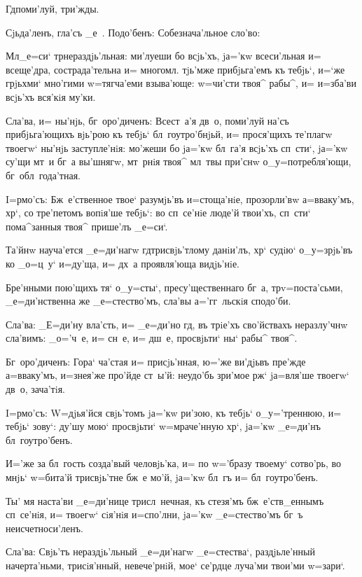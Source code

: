  Гд поми'луй, три'жды.

Сjьда'ленъ, гла'съ _е~. Подо'бенъ: Собезнача'льное 
сло'во:

Мл _е=си` тр нераздjь'льная: ми'луеши бо 
всjь'хъ, jа='кw всеси'льная и= всеще'дра, сострада'тельна 
и= многомл. тjь'мже прибjьга'емъ къ тебjь`, и=`же 
грjьхми` мно'гими w=тягча'еми взыва'юще: w=чи'сти твоя^ 
рабы^, и= и=зба'ви всjь'хъ вся'кiя му'ки.

Сла'ва, и= ны'нjь, бг~оро'диченъ: Всест~а'я дв~о, 
поми'луй на'съ прибjьга'ющихъ вjь'рою къ тебjь` 
бл~гоутро'бнjьй, и= прося'щихъ те'плагw твоегw` ны'нjь 
заступле'нiя: мо'жеши бо jа='кw бл~га'я всjь'хъ сп~сти`, 
jа='кw су'щи мт~и бг~а вы'шнягw, мт~рнiя твоя^ мл~твы 
при'снw о_у=потребля'ющи, бг~обл~года'тная.


I=рмо'съ: Бж~е'ственное твое` разумjь'въ и=стоща'нiе, 
прозорли'вw а=вваку'мъ, хр`, со тре'петомъ вопiя'ше 
тебjь`: во сп~се'нiе люде'й твои'хъ, сп~сти` пома^занныя 
твоя^ прише'лъ _е=си`.

Та'йнw науча'ется _е=ди'нагw гд трисвjь'тлому 
данiи'лъ, хр` судiю` о_у=зрjь'въ ко _о=ц~у` и=ду'ща, 
и= дх~а проявля'юща видjь'нiе. 

Бре'нными пою'щихъ тя` о_у=сты`, пресу'щественнаго 
бг~а, тр v=поста'сьми, _е=ди'нственна же 
_е=стество'мъ, сла'вы а='гг~льскiя сподо'би.

Сла'ва: _Е=ди'ну вла'сть, и= _е=ди'но гд, въ 
трiе'хъ сво'йствахъ неразлу'чнw сла'вимъ: _о='ч~е, и= 
сн~е, и= дш~е, просвjьти` ны` рабы^ твоя^.

Бг~оро'диченъ: Гора` ча'стая и= присjь'нная, ю='же 
ви'дjьвъ пре'жде а=вваку'мъ, и=з\ъ нея'же про'йде ст~ы'й: 
неудо'бь зри'мое рж` jа=вля'ше твоегw` дв~о, 
зача'тiя. 


I=рмо'съ: W=дjья'йся свjь'томъ jа='кw ри'зою, къ 
тебjь` о_у='треннюю, и= тебjь` зову`: ду'шу мою` 
просвjьти` w=мраче'нную хр`, jа='кw _е=ди'нъ 
бл~гоутро'бенъ.

И='же за бл~гость созда'вый человjь'ка, и= по w='бразу 
твоему` сотво'рь, во мнjь` w=бита'й трисвjь'тне бж~е 
мо'й, jа='кw бл~гъ и= бл~гоутро'бенъ.

Ты' мя наста'ви _е=ди'нице трисл~нечная, къ стезя'мъ 
бж~е'ств_еннымъ сп~се'нiя, и= твоегw` сiя'нiя и=спо'лни, 
jа='кw _е=стество'мъ бг~ъ неисчетноси'ленъ.

Сла'ва: Свjь'тъ нераздjь'льный _е=ди'нагw _е=стества`, 
раздjьле'нный начерта'ньми, трисiя'нный, невече'рнiй, 
мое` се'рдце луча'ми твои'ми w=зари`.

